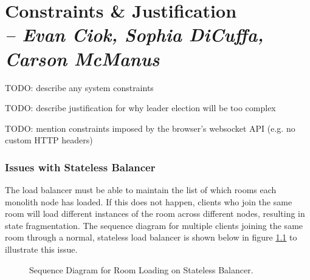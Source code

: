 \chapter{Constraints \& Justification \\
  \small{\textit{-- Evan Ciok, Sophia DiCuffa, Carson McManus}}
  \label{Chapter::ConstraintsJustification}}


TODO: describe any system constraints

TODO: describe justification for why leader election will be too complex

TODO: mention constraints imposed by the browser's websocket API (e.g. no custom HTTP headers)

\subsection{Issues with Stateless Balancer}

The load balancer must be able to maintain the list of which rooms each monolith node has loaded. If this does not happen, clients who join the same room will load different instances of the room across different nodes, resulting in state fragmentation. The sequence diagram for multiple clients joining the same room through a normal, stateless load balancer is shown below in figure \ref{Figure::join-room-stateless} to illustrate this issue.

\begin{figure}[!htb]
  \centering
  \caption{\label{Figure::join-room-stateless} Sequence Diagram for Room Loading on Stateless Balancer.}
\end{figure}
